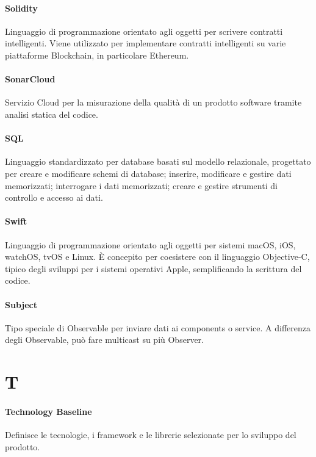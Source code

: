 \documentclass[]{article}
\begin{document}
	\paragraph*{Solidity}
	Linguaggio di programmazione orientato agli oggetti per scrivere contratti intelligenti. Viene utilizzato per implementare contratti intelligenti su varie piattaforme Blockchain, in particolare Ethereum.

    \paragraph*{SonarCloud}
    Servizio Cloud per la misurazione della qualità di un prodotto software tramite analisi statica del codice.

	\paragraph*{SQL}
	Linguaggio standardizzato per database basati sul modello relazionale, progettato per creare e modificare schemi di database; inserire, modificare e gestire dati memorizzati; interrogare i dati memorizzati; creare e gestire strumenti di controllo e accesso ai dati.

	\paragraph*{Swift}
	Linguaggio di programmazione orientato agli oggetti per sistemi macOS, iOS, watchOS, tvOS e Linux. È concepito per coesistere con il linguaggio Objective-C, tipico degli sviluppi per i sistemi operativi Apple, semplificando la scrittura del codice.
	
	\paragraph*{Subject}
	Tipo speciale di Observable per inviare dati ai components o service. A differenza degli Observable, può fare multicast su più Observer.	

	\newpage

	\section*{T}

	\paragraph*{Technology Baseline}
	Definisce le tecnologie, i framework e le librerie selezionate per lo sviluppo del prodotto.
\end{document}
